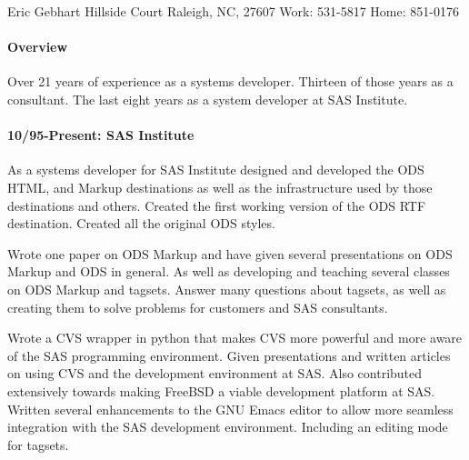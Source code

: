 \documentclass{article}
\begin{document}
\begin{center}
Eric Gebhart
 Hillside Court
\linebreak
Raleigh, NC, 27607
\linebreak
Work: 531-5817
\linebreak
Home: 851-0176
\linebreak
\end{center}

\paragraph{Overview}
Over 21 years of experience as a systems developer.  Thirteen of those years
as a consultant.  The last eight years as a system developer at SAS Institute.       

\paragraph{10/95-Present: SAS Institute}
As a systems developer for SAS Institute designed and developed the ODS HTML,
and Markup destinations as well as the infrastructure used by those destinations
and others.  Created the first working version of the ODS RTF destination.  Created
all the original ODS styles.  

Wrote one paper on ODS Markup and have given several presentations on ODS Markup and ODS
in general.  As well as developing and teaching several classes on ODS Markup and tagsets.
Answer many questions about tagsets, as well as creating them to solve problems for
customers and SAS consultants.

Wrote a CVS wrapper in python that makes CVS more powerful and more aware of the SAS
programming environment.  Given presentations and written articles on using CVS
and the development environment at SAS.
Also contributed extensively towards making FreeBSD a viable
development platform at SAS.  Written several enhancements to the GNU Emacs editor to allow
more seamless integration with the SAS development environment.  Including an editing mode
for tagsets.
\end{document}
